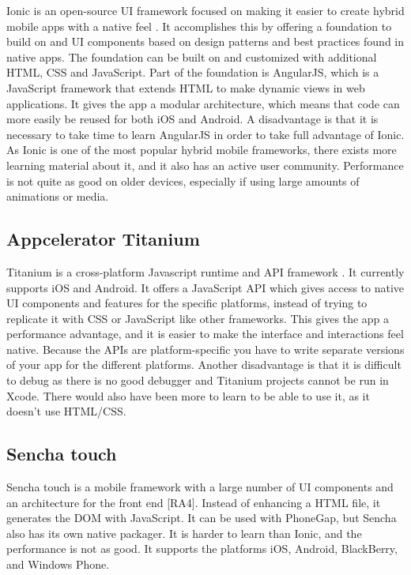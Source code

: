 Ionic is an open-source UI framework focused on making it easier to create hybrid mobile apps with a native feel \cite{RA1}. It accomplishes this by offering a foundation to build on and UI components based on design patterns and best practices found in native apps. The foundation can be built on and customized with additional HTML, CSS and JavaScript. Part of the foundation is AngularJS, which is a JavaScript framework that extends HTML to make dynamic views in web applications. It gives the app a modular architecture, which means that code can more easily be reused for both iOS and Android. A disadvantage is that it is necessary to take time to learn AngularJS in order to take full advantage of Ionic. As Ionic is one of the most popular hybrid mobile frameworks, there exists more learning material about it, and it also has an active user community. Performance is not quite as good on older devices, especially if using large amounts of animations or media.

\subsection{Appcelerator Titanium}

Titanium is a cross-platform Javascript runtime and API framework \cite{RA3}. It currently supports iOS and Android. It offers a JavaScript API which gives access to native UI components and features for the specific platforms, instead of trying to replicate it with CSS or JavaScript like other frameworks. This gives the app a performance advantage, and it is easier to make the interface and interactions feel native. Because the APIs are platform-specific you have to write separate versions of your app for the different platforms. Another disadvantage is that it is difficult to debug as there is no good debugger and Titanium projects cannot be run in Xcode. There would also have been more to learn to be able to use it, as it doesn’t use HTML/CSS.

\subsection{Sencha touch}

Sencha touch is a mobile framework with a large number of UI components and an architecture for the front end [RA4]. Instead of enhancing a HTML file, it generates the DOM with JavaScript. It can be used with PhoneGap, but Sencha also has its own native packager. It is harder to learn than Ionic, and the performance is not as good.  It supports the platforms iOS, Android, BlackBerry, and Windows Phone.

